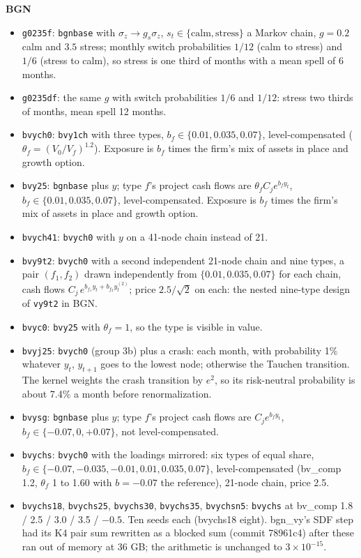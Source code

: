\noindent\textbf{BGN}
\begin{itemize}
\item \texttt{g0235f}: \texttt{bgnbase} with $\sigma_z\to g_s\sigma_z$, $s_t\in\{\text{calm},\text{stress}\}$ a Markov chain, $g=0.2$ calm and $3.5$ stress; monthly switch probabilities $1/12$ (calm to stress) and $1/6$ (stress to calm), so stress is one third of months with a mean spell of 6 months.
\item \texttt{g0235df}: the same $g$ with switch probabilities $1/6$ and $1/12$: stress two thirds of months, mean spell 12 months.
\item \texttt{bvych0}: \texttt{bvy1ch} with three types, $b_f\in\{0.01,0.035,0.07\}$, level-compensated ($\theta_f=(V_0/V_f)^{1.2}$). Exposure is $b_f$ times the firm's mix of assets in place and growth option.
\item \texttt{bvy25}: \texttt{bgnbase} plus $y$; type $f$'s project cash flows are $\theta_f C_j e^{b_f y_t}$, $b_f\in\{0.01,0.035,0.07\}$, level-compensated. Exposure is $b_f$ times the firm's mix of assets in place and growth option.
\item \texttt{bvych41}: \texttt{bvych0} with $y$ on a 41-node chain instead of 21.
\item \texttt{bvy9t2}: \texttt{bvych0} with a second independent 21-node chain and nine types, a pair $(f_1,f_2)$ drawn independently from $\{0.01,0.035,0.07\}$ for each chain, cash flows $C_j\,e^{b_{f_1}y_t+b_{f_2}y^{(2)}_t}$; price $2.5/\sqrt2$ on each: the nested nine-type design of \texttt{vy9t2} in BGN.
\item \texttt{bvyc0}: \texttt{bvy25} with $\theta_f=1$, so the type is visible in value.
\item \texttt{bvyj25}: \texttt{bvych0} (group 3b) plus a crash: each month, with probability 1\% whatever $y_t$, $y_{t+1}$ goes to the lowest node; otherwise the Tauchen transition. The kernel weights the crash transition by $e^{2}$, so its risk-neutral probability is about 7.4\% a month before renormalization.
\item \texttt{bvysg}: \texttt{bgnbase} plus $y$; type $f$'s project cash flows are $C_j e^{b_f y_t}$, $b_f\in\{-0.07,0,+0.07\}$, not level-compensated.
\item \texttt{bvychs}: \texttt{bvych0} with the loadings mirrored: six types of equal share, $b_f\in\{-0.07,-0.035,-0.01,0.01,0.035,0.07\}$, level-compensated (bv\_comp 1.2, $\theta_f$ 1 to 1.60 with $b=-0.07$ the reference), 21-node chain, price 2.5.
\item \texttt{bvychs18}, \texttt{bvychs25}, \texttt{bvychs30}, \texttt{bvychs35}, \texttt{bvychsn5}: \texttt{bvychs} at bv\_comp 1.8 / 2.5 / 3.0 / 3.5 / $-0.5$. Ten seeds each (bvychs18 eight). bgn\_vy's SDF step had its K4 pair sum rewritten as a blocked sum (commit 78961c4) after these ran out of memory at 36 GB; the arithmetic is unchanged to $3\times10^{-15}$.

\end{itemize}
